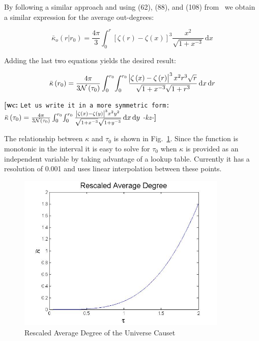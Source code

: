 \documentclass[preprint,notitlepage,amsmath,amssymb,floatfix]{revtex4-1}
\newcommand{\XXX}[3]{{\bf [#1: } {\tt #3} {\it -#2-}{\bf ]}}
\begin{document}
\noindent By following a similar approach and using (62), (88), and (108) from~\cite{ref:snc2012} we obtain a similar expression for the average out-degrees:

\begin{equation}
\bar\kappa_o\left(r|r_0\right) = \frac{4\pi}{3}\int_0^r\!\left[\zeta\left(r\right) - \zeta\left(x\right)\right]^3\frac{x^2}{\sqrt{1+x^{-3}}}\,\mathrm dx
\end{equation}

\noindent Adding the last two equations yields the desired result:

\begin{equation}
\label{eq:kappa}
\bar\kappa\left(r_0\right) = \frac{4\pi}{3\mathcal{N}\left(\tau_0\right)}\int_0^{r_0} \! \int_0^{r_0} \frac{\abs{\zeta\left(x\right) - \zeta\left(r\right)}^3 x^2 r^3 \sqrt r}{\sqrt{1+x^{-3}}\sqrt{1+r^3}}\,\mathrm dx\,\mathrm dr
\end{equation}

\XXX{wc}{kz}{Let us write it in a more symmetric form: 
	$\bar\kappa\left(\tau_0\right) = \frac{4\pi}{3\mathcal{N}\left(\tau_0\right)}\int_0^{r_0} \! \int_0^{r_0} \frac{\abs{\zeta\left(x\right) - \zeta\left(y\right)}^3 x^2 y^2 }{\sqrt{1+x^{-3}}\sqrt{1+y^{-3}}}\,\mathrm dx\,\mathrm dy$}

\noindent The relationship between $\kappa$ and $\tau_0$ is shown in Fig.~\ref{fig:kappa_tau}.
Since the function is monotonic in the interval it is easy to solve for $\tau_0$ when $\kappa$ is provided as an independent variable by taking advantage of a lookup table.  
Currently it has a resolution of 0.001 and uses linear interpolation between these points.

\begin{figure}
\includegraphics[width=10cm]{figures/Rescaled_Average_Degree.jpg}
\caption{Rescaled Average Degree of the Universe Causet}
\label{fig:kappa_tau}
\centering
\end{figure}
\end{document}
